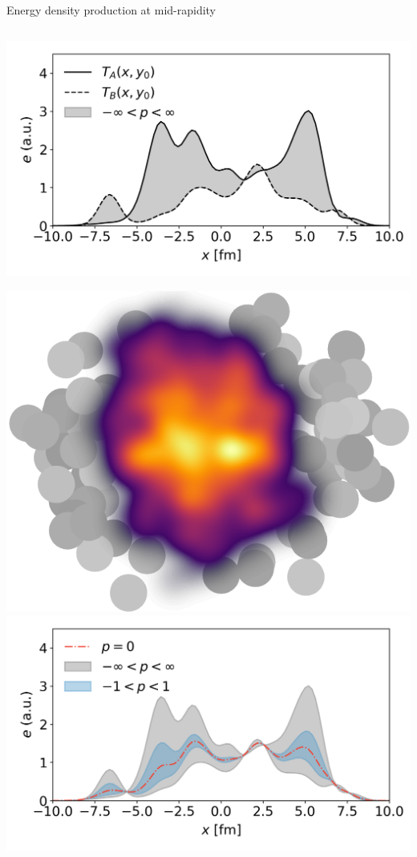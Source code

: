 \documentclass[11pt, aspectratio=169]{beamer}
\begin{document}
\begin{frame}{Energy density production at mid-rapidity}
\begin{columns}
\begin{column}{.35\textwidth}
\begin{overprint}
\begin{center}
\includegraphics[width=\textwidth]{trento_p_allp.png}
\end{center}
\begin{center}
\includegraphics[width=.7\textwidth]{s-density.png}\\
\includegraphics[width=\textwidth]{trento_p_p11.png}
\end{center}
\end{overprint}

\end{column}
\end{columns}
\end{frame}
\end{document}
